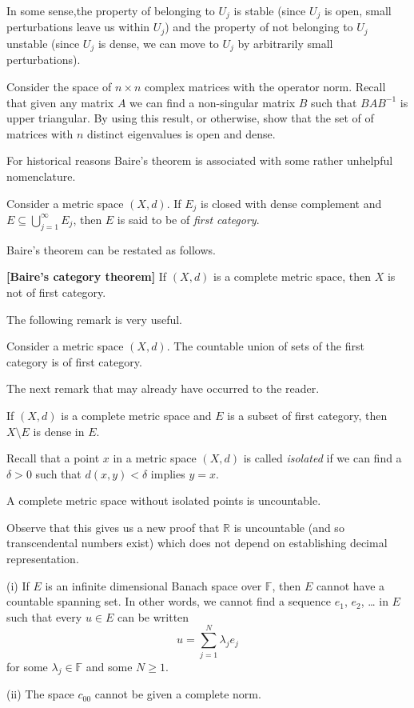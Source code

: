 In some sense,the property of belonging to $U_{j}$ is
stable (since $U_{j}$ is open, small perturbations 
leave us within $U_{j}$) and the property of not belonging
to $U_{j}$ unstable (since $U_{j}$ is dense, we can move
to $U_{j}$ by arbitrarily small perturbations). 
\begin{exercise}\label{E;dense matrices}
Consider the space of $n\times n$ complex
matrices with the operator norm. Recall that given
any matrix $A$ we can find a non-singular matrix $B$
such that $BAB^{-1}$ is upper triangular. By using this result,
or otherwise, 
show that the set of of matrices with $n$ distinct eigenvalues
is open and dense.
\end{exercise}
For historical reasons Baire's theorem is associated
with some rather unhelpful nomenclature.
\begin{definition} Consider a metric space $(X,d)$.
If $E_{j}$ is closed with dense complement and
$E\subseteq\bigcup_{j=1}^{\infty}E_{j}$, then
$E$ is said to be of \emph{first category}.
\end{definition}
Baire's theorem can be restated as follows.
\begin{theorem}{\bf[Baire's category theorem]}
If $(X,d)$ is a complete metric space, then
$X$ is not of first category.
\end{theorem}
The following remark is very useful.
\begin{lemma} Consider a metric space $(X,d)$.
The countable union of sets of the first category
is of first category.
\end{lemma}
The next remark that may already have occurred to the reader.
\begin{exercise} If $(X,d)$ is a complete metric space
and $E$ is a subset of first category, then $X\setminus E$
is dense in $E$.
\end{exercise}
Recall that a point $x$ in a metric space $(X,d)$ is called
\emph{isolated} if we can find a $\delta>0$ such that
$d(x,y)<\delta$ implies $y=x$.
\begin{lemma} A complete metric space without isolated
points is uncountable.
\end{lemma}
Observe that this gives us a new proof that 
${\mathbb R}$ is uncountable (and so transcendental numbers exist)
which does not depend on establishing decimal representation.
\begin{lemma}\label{L;no countable} (i) If $E$ is an infinite dimensional 
Banach space over ${\mathbb F}$, 
then $E$ cannot have a countable spanning set.
In other words, we cannot find a sequence $e_{1}$, $e_{2}$, \dots
in $E$ such that every $u\in E$ can be  written
\[u=\sum_{j=1}^{N}\lambda_{j}e_{j}\]
for some $\lambda_{j}\in{\mathbb F}$ and some $N\geq 1$.

(ii) The space $c_{00}$ cannot be given a complete norm.
\end{lemma}

